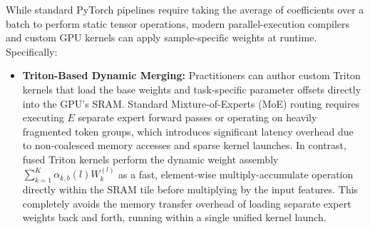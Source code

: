 While standard PyTorch pipelines require taking the average of coefficients over a batch to perform static tensor operations, modern parallel-execution compilers and custom GPU kernels can apply sample-specific weights at runtime. Specifically:
\begin{itemize}
    \item \textbf{Triton-Based Dynamic Merging:} Practitioners can author custom Triton kernels that load the base weights and task-specific parameter offsets directly into the GPU's SRAM. Standard Mixture-of-Experts (MoE) routing requires executing $E$ separate expert forward passes or operating on heavily fragmented token groups, which introduces significant latency overhead due to non-coalesced memory accesses and sparse kernel launches. In contrast, fused Triton kernels perform the dynamic weight assembly $\sum_{k=1}^K \alpha_{k, b}(l) W_k^{(l)}$ as a fast, element-wise multiply-accumulate operation directly within the SRAM tile before multiplying by the input features. This completely avoids the memory transfer overhead of loading separate expert weights back and forth, running within a single unified kernel launch. 
    

\end{itemize}

